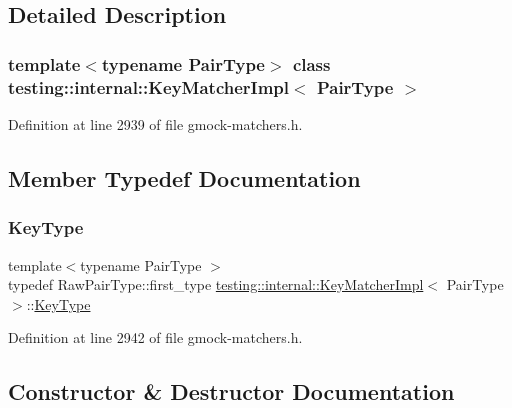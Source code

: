 \subsection{Detailed Description}
\subsubsection*{template$<$typename Pair\+Type$>$\newline
class testing\+::internal\+::\+Key\+Matcher\+Impl$<$ Pair\+Type $>$}



Definition at line 2939 of file gmock-\/matchers.\+h.



\subsection{Member Typedef Documentation}
\mbox{\label{classtesting_1_1internal_1_1KeyMatcherImpl_a9bd63b699518bd9868ba24766547667a}} 
\subsubsection{\texorpdfstring{Key\+Type}{KeyType}}
{\footnotesize\ttfamily template$<$typename Pair\+Type $>$ \\
typedef Raw\+Pair\+Type\+::first\+\_\+type \hyperlink{classtesting_1_1internal_1_1KeyMatcherImpl}{testing\+::internal\+::\+Key\+Matcher\+Impl}$<$ Pair\+Type $>$\+::\hyperlink{classtesting_1_1internal_1_1KeyMatcherImpl_a9bd63b699518bd9868ba24766547667a}{Key\+Type}}



Definition at line 2942 of file gmock-\/matchers.\+h.



\subsection{Constructor \& Destructor Documentation}
\mbox{\label{classtesting_1_1internal_1_1KeyMatcherImpl_a9ad2a218b0366cae9fb09e82347bd8e7}} 
